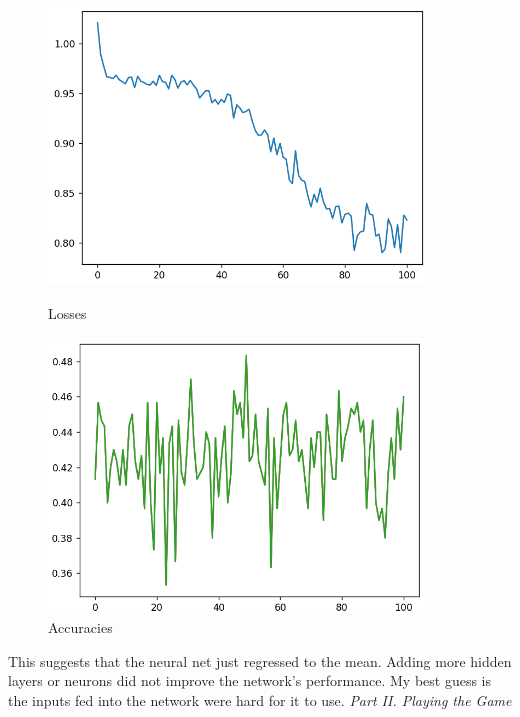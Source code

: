 \documentclass[]{article}
\begin{document}
\begin{figure}[H]
\centering
\begin{minipage}{0.5\textwidth}
	\centering
	\includegraphics[width=0.9\textwidth]{loss}
	\caption{Losses}
\end{minipage}\hfill
\begin{minipage}{0.5\textwidth}
	\centering
	\includegraphics[width=0.9\textwidth]{accuracies}
	\caption{Accuracies}
\end{minipage}
\end{figure}
This suggests that the neural net just regressed to the mean. Adding more hidden layers or neurons did not improve the network's performance. My best guess is the inputs fed into the network were hard for it to use.
\vspace{0.25cm}\newline\noindent
\emph{Part II. Playing the Game}
\newline\indent
\end{document}
